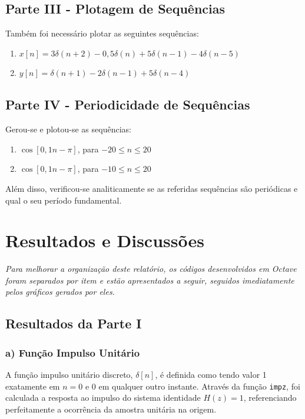 \documentclass[tcc]{classe_uftex/uftex}
\begin{document}
\section{Parte III - Plotagem de Sequências}
Também foi necessário plotar as seguintes sequências:
\begin{enumerate}
    \item[\textbf{a)}] $x[n] = 3\delta(n + 2) - 0,5\delta(n) + 5\delta(n - 1) - 4\delta(n - 5)$
    \item[\textbf{b)}] $y[n] = \delta(n + 1) - 2\delta(n - 1) + 5\delta(n - 4)$
\end{enumerate}

\section{Parte IV - Periodicidade de Sequências}
Gerou-se e plotou-se as sequências:
\begin{enumerate}
    \item[\textbf{a)}] $\cos[0,1n - \pi]$, para $-20 \leq n \leq 20$
    \item[\textbf{b)}] $\cos[0,1n - \pi]$, para $-10 \leq n \leq 20$
\end{enumerate}
Além disso, verificou-se analiticamente se as referidas sequências são periódicas e qual o seu período fundamental.

\chapter{Resultados e Discussões}

\textit{Para melhorar a organização deste relatório, os códigos desenvolvidos em Octave foram separados por item e estão apresentados a seguir, seguidos imediatamente pelos gráficos gerados por eles.}

\section{Resultados da Parte I}

\subsection*{a) Função Impulso Unitário}
A função impulso unitário discreto, $\delta[n]$, é definida como tendo valor 1 exatamente em $n = 0$ e 0 em qualquer outro instante. Através da função \texttt{impz}, foi calculada a resposta ao impulso do sistema identidade $H(z)=1$, referenciando perfeitamente a ocorrência da amostra unitária na origem.
\end{document}
